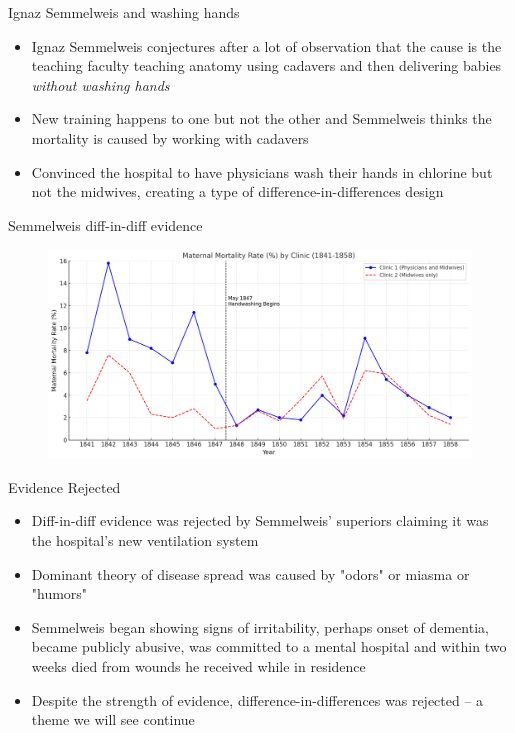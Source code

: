 \documentclass{beamer}
\begin{document}
\begin{frame}{Ignaz Semmelweis and washing hands}

\begin{itemize}
\item Ignaz Semmelweis conjectures after a lot of observation that the cause is the teaching faculty teaching anatomy using cadavers and then delivering babies \emph{without washing hands}
\item New training happens to one but not the other and Semmelweis thinks the mortality is caused by working with cadavers
\item Convinced the hospital to have physicians wash their hands in chlorine but not the midwives, creating a type of difference-in-differences design 
\end{itemize}

\end{frame}

\begin{frame}{Semmelweis diff-in-diff evidence}

	\begin{figure}
	\includegraphics[scale=0.4]{./lecture_includes/semmelweis_graphic.png}
	\end{figure}


\end{frame}

\begin{frame}{Evidence Rejected}

\begin{itemize}

\item Diff-in-diff evidence was rejected by Semmelweis' superiors claiming it was the hospital's new ventilation system
\item Dominant theory of disease spread was caused by "odors" or miasma or "humors"
\item Semmelweis began showing signs of irritability, perhaps onset of dementia, became publicly abusive, was committed to a mental hospital and within two weeks died from wounds he received while in residence
\item Despite the strength of evidence, difference-in-differences was rejected -- a theme we will see continue

\end{itemize}

\end{frame}
\end{document}
